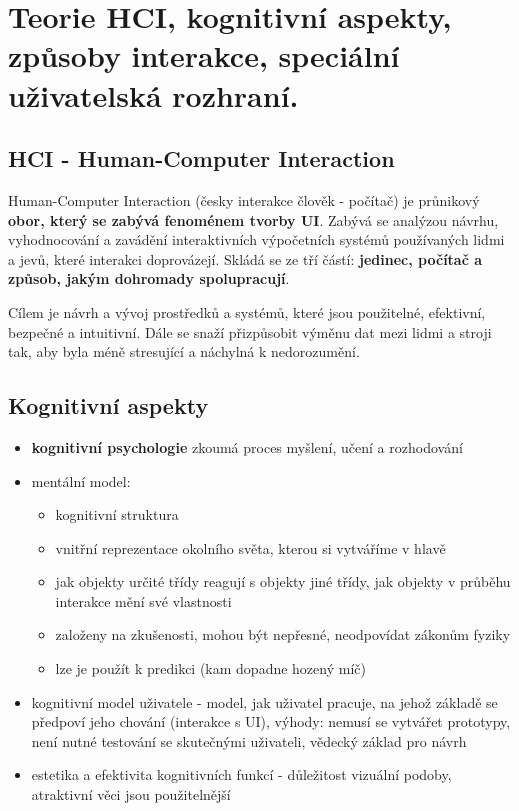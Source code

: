 \section[NUR - Teorie HCI]{Teorie HCI, kognitivní aspekty, způsoby interakce, speciální uživatelská rozhraní.}
\subsection{HCI - Human-Computer Interaction}

Human-Computer Interaction (česky interakce člověk - počítač) je průnikový \textbf{obor, který se zabývá fenoménem tvorby UI}. Zabývá se analýzou návrhu, vyhodnocování a zavádění interaktivních výpočetních systémů používaných lidmi a jevů, které interakci doprovázejí. Skládá se ze tří částí: \textbf{jedinec, počítač a způsob, jakým dohromady spolupracují}.

Cílem je návrh a vývoj prostředků a systémů, které jsou použitelné, efektivní, bezpečné a intuitivní. Dále se snaží přizpůsobit výměnu dat mezi lidmi a stroji tak, aby byla méně stresující a náchylná k nedorozumění.

\subsection{Kognitivní aspekty}
\begin{itemize}[itemsep=0px]
\item \textbf{kognitivní psychologie} zkoumá proces myšlení, učení a rozhodování
\item mentální model:
    \begin{itemize}[itemsep=0px]
    \item kognitivní struktura
    \item vnitřní reprezentace okolního světa, kterou si vytváříme v hlavě
    \item jak objekty určité třídy reagují s objekty jiné třídy, jak objekty v průběhu interakce mění své vlastnosti
    \item založeny na zkušenosti, mohou být nepřesné, neodpovídat zákonům fyziky
    \item lze je použít k predikci (kam dopadne hozený míč)
    \end{itemize}
\item kognitivní model uživatele - model, jak uživatel pracuje, na jehož základě se předpoví jeho chování (interakce s UI), výhody: nemusí se vytvářet prototypy, není nutné testování se skutečnými uživateli, vědecký základ pro návrh
\item estetika a efektivita kognitivních funkcí - důležitost vizuální podoby, atraktivní věci jsou použitelnější
\end{itemize}

